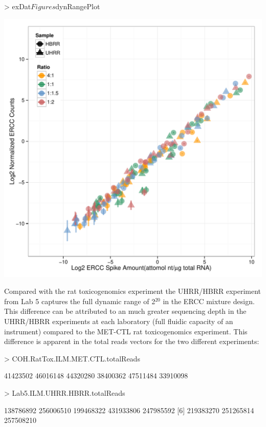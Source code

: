 \documentclass{article}
\begin{document}
\clearpage
\begin{center}
\begin{Schunk}
\begin{Sinput}
> exDat$Figures$dynRangePlot
\end{Sinput}
\end{Schunk}
\includegraphics{erccdashboardVignette-seqcCountPlotA}
\end{center}
Compared with the rat toxicogenomics experiment the UHRR/HBRR experiment from Lab 5 
captures the full dynamic range of 2$^{20}$ in the ERCC mixture design. This 
difference can be attributed to an much greater sequencing depth in the 
UHRR/HBRR experiments at each laboratory (full fluidic capacity of an 
instrument) compared to the MET-CTL rat toxicogenomics experiment. This 
difference is apparent in the total reads vectors for the two different 
experiments:
\begin{Schunk}
\begin{Sinput}
> COH.RatTox.ILM.MET.CTL.totalReads
\end{Sinput}
\begin{Soutput}
[1] 41423502 46016148 44320280 38400362 47511484 33910098
\end{Soutput}
\begin{Sinput}
> Lab5.ILM.UHRR.HBRR.totalReads
\end{Sinput}
\begin{Soutput}
[1] 138786892 256006510 199468322 431933806 247985592
[6] 219383270 251265814 257508210
\end{Soutput}
\end{Schunk}
\end{document}
